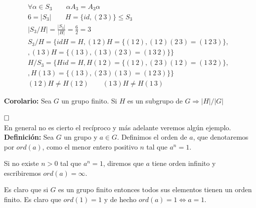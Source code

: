 \documentclass{article}
\begin{document}
\begin{gather*}
\forall \alpha \in S_3 \qquad \alpha A_3=A_3\alpha \\
6=|S_3| \qquad H=\{id,(2\,3)\}\leq S_3 \\
|S_3/H|=\frac{|S_3|}{|H|}=\frac{6}{2}=3 \\
S_3/H=\{idH=H, (1\,2)H=\{(1\,2),(1\,2)(2\,3)=(1\,2\,3)\}, \\
,(1\,3)H=\{(1\,3),(1\,3)(2\,3)=(1\,3\,2)\}\} \\
H/S_3=\{Hid=H, H(1\,2)=\{(1\,2),(2\,3)(1\,2)=(1\,3\,2)\}, \\
,H(1\,3)=\{(1\,3),(2\,3)(1\,3)=(1\,2\,3)\}\} \\
(1\,2)H\neq H(1\,2) \qquad (1\,3)H\neq H(1\,3)
\end{gather*}

\textbf{Corolario:} Sea $G$ un grupo finito. Si $H$ es un subgrupo de $G \Rightarrow |H|/|G|$

$\hfill\square$ \\

En general no es cierto el recíproco y más adelante veremos algún ejemplo. \\

\textbf{Definición:} Sea $G$ un grupo y $a\in G$. Definimos el orden de $a$, que denotaremos por $ord(a)$, como el menor entero positivo $n$ tal que $a^n=1$.

Si no existe $n>0$ tal que $a^n=1$, diremos que $a$ tiene orden infinito y escribiremos $ord(a)=\infty$.

Es claro que si $G$ es un grupo finito entonces todos sus elementos tienen un orden finito. Es claro que $ord(1)=1$ y de hecho $ord(a)=1\Leftrightarrow a=1$. \\
\end{document}
